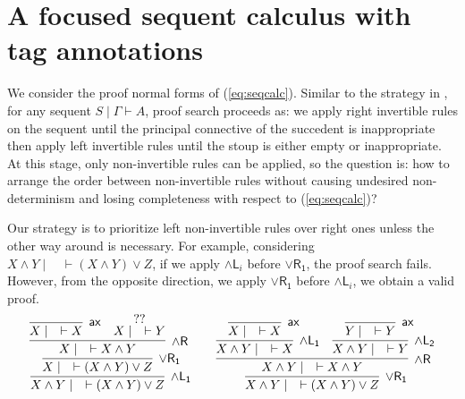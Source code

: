 \documentclass[submission,copyright,creativecommons]{eptcs}
\theoremstyle{definition}
\newcommand{\andlone}{\land \mathsf{L_{1}}}
\newcommand{\andltwo}{\land \mathsf{L_{2}}}
\newcommand{\andli}{\land \mathsf{L}_{i}}
\newcommand{\andr}{\land \mathsf{R}}
\newcommand{\orrone}{\lor \mathsf{R_{1}}}
\newcommand{\ax}{\mathsf{ax}}
\begin{document}
\section{A focused sequent calculus with tag annotations}
We consider the proof normal forms of (\ref{eq:seqcalc}).
Similar to the strategy in \cite{UVW:protsn}, for any sequent $S \mid \Gamma \vdash A$, proof search proceeds as: we apply right invertible rules on the sequent until the principal connective of the succedent is inappropriate then apply left invertible rules until the stoup is either empty or inappropriate.
At this stage, only non-invertible rules can be applied, so the question is: how to arrange the order between non-invertible rules without causing undesired non-determinism and losing completeness with respect to (\ref{eq:seqcalc})?

Our strategy is to prioritize left non-invertible rules over right ones unless the other way around is necessary.
For example, considering $X \land Y \mid \quad \vdash (X \land Y) \lor Z$, if we apply $\andli$ before $\orrone$, the proof search fails.
However, from the opposite direction, we apply $\orrone$ before $\andli$, we obtain a valid proof.
\begin{equation}\label{eq:ex:focused}
  \begin{array}{c}
    \infer[\andlone]{X \land Y \mid \quad \vdash (X \land Y) \lor Z}{
      \infer[\orrone]{X \mid \quad \vdash (X \land Y) \lor Z}
      {
         \infer[\andr]{X \mid \quad \vdash X \land Y}{
           \infer[\ax]{X \mid \quad \vdash X}{}
           &
           \deduce{X \mid \quad \vdash Y}{??}
         }
      }
     }
     \qquad
     \infer[\orrone]{X \land Y \mid \quad \vdash (X \land Y) \lor Z}{
      \infer[\andr]{X \land Y \mid \quad \vdash X \land Y}{
        \infer[\andlone]{X \land Y \mid \quad \vdash X}{
          \infer[\ax]{X \mid \quad \vdash X}{}
        }
        &
        \infer[\andltwo]{X \land Y \mid \quad \vdash Y}{
          \infer[\ax]{Y \mid \quad \vdash Y}{}
        }
      }
    }
  \end{array}
\end{equation}
\end{document}
